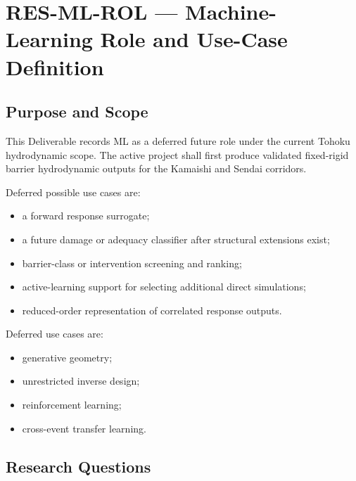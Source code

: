 
\section{RES-ML-ROL --- Machine-Learning Role and Use-Case Definition}
\label{sec:res-ml-rol}

\subsection{Purpose and Scope}
\label{sec:res-ml-rol-purpose}

This Deliverable records ML as a deferred future role under the
current Tohoku hydrodynamic scope. The active project shall first
produce validated fixed-rigid barrier hydrodynamic outputs for the
Kamaishi and Sendai corridors.

Deferred possible use cases are:
\begin{itemize}
  \item a forward response surrogate;
  \item a future damage or adequacy classifier after structural
    extensions exist;
  \item barrier-class or intervention screening and ranking;
  \item active-learning support for selecting additional direct simulations;
  \item reduced-order representation of correlated response outputs.
\end{itemize}

Deferred use cases are:
\begin{itemize}
  \item generative geometry;
  \item unrestricted inverse design;
  \item reinforcement learning;
  \item cross-event transfer learning.
\end{itemize}

\subsection{Research Questions}
\label{sec:res-ml-rol-research-questions}

